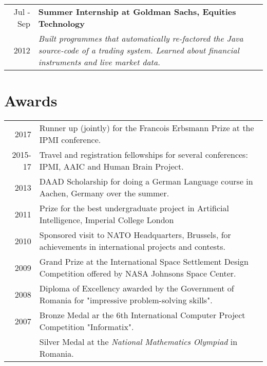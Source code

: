 \documentclass[a4paper,10pt]{article} %
\begin{document}
\begin{tabular}{r|p{15cm}}
Jul - Sep & \large\textbf{Summer Internship at Goldman Sachs, Equities Technology}\\
2012 & \emph{Built programmes that automatically re-factored the Java source-code of a trading system. Learned about financial instruments and live market data.}\\




\end{tabular}


\section*{Awards}

\begin{tabular}{r|p{15.7cm}}
2017 & Runner up (jointly) for the Francois Erbsmann Prize at the IPMI conference.\\
2015-17 & Travel and registration fellowships for several conferences: IPMI, AAIC and Human Brain Project.\\
2013 & DAAD Scholarship for doing a German Language course in Aachen, Germany over the summer.\\
2011 & Prize for the best undergraduate project in Artificial Intelligence, Imperial College London\\
2010 & Sponsored visit to NATO Headquarters, Brussels, for achievements in international projects and contests.\\
2009 & Grand Prize at the International Space Settlement Design Competition offered by NASA Johnsons Space Center.\\
2008 & Diploma of Excellency awarded by the Government of Romania for "impressive problem-solving skills".\\
2007 & Bronze Medal ar the 6th International Computer Project Competition
"Informatix".\\
& Silver Medal at the \emph{National Mathematics Olympiad} in Romania.
\end{tabular}
\end{document}
